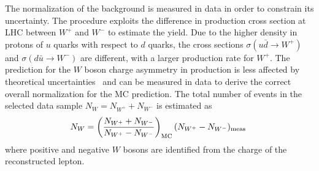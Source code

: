 The normalization of the \wjets{} background is measured in data in
order to constrain its uncertainty.
The procedure exploits the difference in production cross section at LHC
between $W^+$ and $W^-$ to estimate the \wjets{} yield.
Due to the higher density in protons of $u$ quarks with respect to $d$ quarks,
the cross sections $\sigma(u\bar{d}\to W^+)$ and $\sigma(d\bar{u}\to
W^-)$ are different, with a larger production rate for $W^+$. The
prediction for the $W$ boson charge asymmetry in \wjets{} production is less
affected by theoretical uncertainties~\cite{wasym} and can be measured
in data to derive the correct overall normalization for the MC prediction.
The total number of \wjets{} events in the selected data sample
$N_{W}=N_{W^+}+N_{W^-}$ is estimated as
\begin{equation}
N_{W} = \left(\frac{N_{W^+}+N_{W^-}}{N_{W^+}-N_{W^-}}\right )_{\rm
  MC}(N_{W^+}-N_{W^-})_{\rm meas}
\phantom{,}
\label{eq:nw}
\end{equation}
where positive and negative $W$ bosons are identified from the
charge of the reconstructed lepton. 

